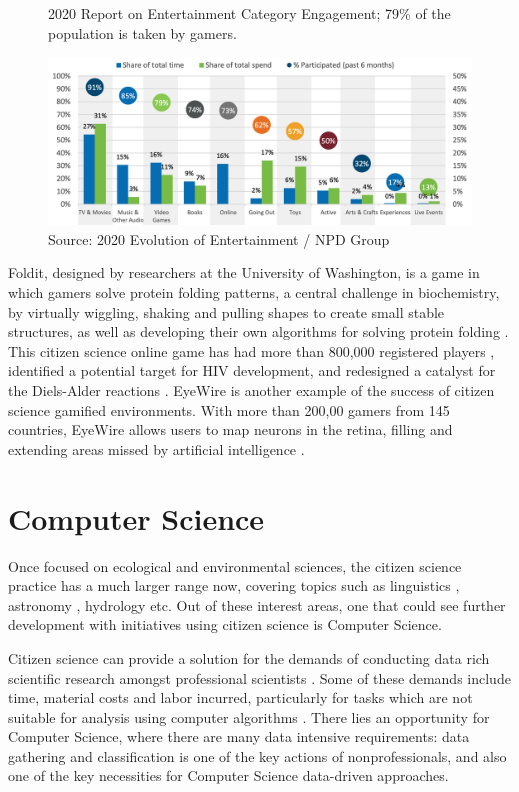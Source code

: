 \begin{figure}[ht]
    \centering
    \caption{2020 Report on Entertainment Category Engagement; 79\% of the population is taken by gamers.}
    \includegraphics[width=\linewidth]{images/game.png}
    \caption*{Source: 2020 Evolution of Entertainment / NPD Group}
    \label{fig:entertainment-report}
\end{figure}

Foldit, designed by researchers at the University of Washington, is a game in which gamers solve protein folding patterns, a central challenge in biochemistry, by virtually wiggling, shaking and pulling shapes to create small stable structures, as well as developing their own algorithms for solving protein folding \cite{bourzac2008enlisting}. This citizen science online game has had more than 800,000 registered players \cite{foldit2021players}, identified a potential target for HIV development, and redesigned a catalyst for the Diels-Alder reactions \cite{kreitmair2019citizen}. EyeWire is another example of the success of citizen science gamified environments. With more than 200,00 gamers from 145 countries, EyeWire allows users to map neurons in the retina, filling and extending areas missed by artificial intelligence \cite{kreitmair2019citizen}.

\section*{Computer Science}

Once focused on ecological and environmental sciences, the citizen science practice has a much larger range now, covering topics such as linguistics \cite{svendsen2018dynamics}, astronomy \cite{marshall2015ideas}, hydrology \cite{buytaert2014citizen} etc. Out of these interest areas, one that could see further development with initiatives using citizen science is Computer Science.

Citizen science can provide a solution for the demands of conducting data rich scientific research amongst 
professional scientists \cite{greenhill2014playing}. Some of these demands include time, material costs and labor incurred, particularly for tasks which are not suitable for analysis using computer algorithms \cite{silvertown2009new}. There lies an opportunity for Computer Science, where there are many data intensive requirements: data gathering and classification is one of the key actions of nonprofessionals, and also one of the key necessities for Computer Science data-driven approaches.

